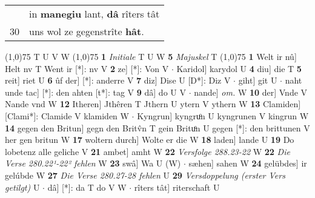 \documentclass[8pt,a4paper,notitlepage]{article}
\begin{document}
\begin{table}[ht]
\begin{minipage}[t]{0.5\linewidth}
\begin{tabular}{rl}
 & in \textbf{manegiu} lant, \textbf{dâ} rîters tât\\ 
30 & uns wol ze gegenstrîte \textbf{hât}.\\ 
\end{tabular}
\scriptsize
\line(1,0){75} \newline
T U V W \newline
\line(1,0){75} \newline
\textbf{1} \textit{Initiale} T U W  \textbf{5} \textit{Majuskel} T  \newline
\line(1,0){75} \newline
\textbf{1} Welt ir nû] Helt nv T Went ir [*]: nv V \textbf{2} ze] [*]: Von V  $\cdot$ Karidol] karydol U \textbf{4} diu] die T \textbf{5} reit] riet U \textbf{6} ûf der] [*]: anderre V \textbf{7} diz] Dise U [D*]: Diz V  $\cdot$ giht] git U  $\cdot$ naht unde tac] [*]: den ahten [t*]: tag V \textbf{9} dâ] do U V  $\cdot$ nande] \textit{om.} W \textbf{10} der] Vnde V Nande vnd W \textbf{12} Itheren] Jthêren T Jthern U ytern V ythern W \textbf{13} Clamiden] [Clami*]: Clamide V klamiden W  $\cdot$ Kyngrun] kyngruͦn U kyngrunen V kingrun W \textbf{14} gegen den Britun] gegn den Britv̂n T gein Brituͦn U gegen [*]: den brittunen V her gen britun W \textbf{17} woltern durch] Wolte er die W \textbf{18} laden] lande U \textbf{19} Do lobetenz alle geliche V \textbf{21} ambet] amht W \textbf{22} \textit{Versfolge 288.23-22} W  \textbf{22} \textit{Die Verse 280.22¹-22² fehlen} W  \textbf{23} swâ] Wa U (W)  $\cdot$ sæhen] sahen W \textbf{24} gelübdes] ir gelúbde W \textbf{27} \textit{Die Verse 280.27-28 fehlen} U  \textbf{29} \textit{Versdoppelung (erster Vers getilgt)} U   $\cdot$ dâ] [*]: da T do V W  $\cdot$ rîters tât] riterschaft U \newline
\end{minipage}
\end{table}
\end{document}
